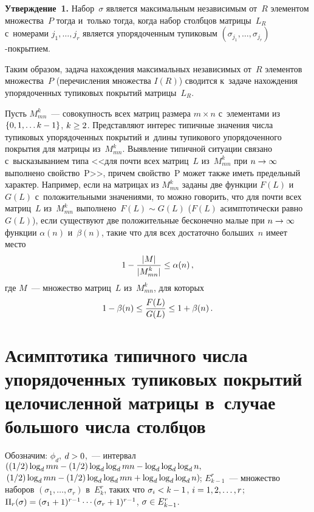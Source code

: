 \begin{multicols}{2}
    \noindent
    \textbf{Утверждение~1.} Набор~$\sigma$ является максимальным 
независимым от~$R$ элементом множества~$P$ тогда и~только тогда, когда 
набор столбцов матрицы~$L_R$ с~номерами $j_1,\ldots, j_r$ является 
упорядоченным тупиковым $(\sigma_{j_1}, \ldots , \sigma_{j_r})$-по\-кры\-тием.
    
    Таким образом, задача нахождения максимальных независимых от~$R$ 
элементов множества~$P$ (перечисления множества $I(R)$) сводится к~задаче 
нахождения упорядоченных тупиковых покрытий матрицы~$L_R$. 
    
    Пусть $M^k_{mn}$~--- совокупность всех матриц размера $m\times n$ 
    с~элементами из $\{0,1,\ldots k\hm-1\}$, $k\hm\geq 2$.  Представляют интерес 
типичные значения числа тупиковых упорядоченных покрытий и~длины 
тупикового упорядоченного покрытия для матрицы из~$M^k_{mn}$. 
Выявление типичной ситуации  связано с~высказыванием типа <<для почти 
всех матриц~$L$ из~$M_{mn}^k$ при $n\hm\to \infty$ выполнено 
свойство~P>>, причем свойство~P  может также иметь предельный характер. 
Например, если на матрицах из $M_{mn}^k$ заданы две функции $F(L)$ 
и~$G(L)$ с~положительными зна\-че\-ни\-ями, 
то  мож\-но говорить, что для почти всех мат\-риц~$L$ из~$M^k_{mn}$ 
выполнено~$F(L) \sim G(L)$ ($F(L)$ асимптотически равно $G(L)$), если 
существуют две положительные бесконечно малые при $n\hm\to\infty$ функции 
$\alpha(n)$ и~$\beta(n)$, такие что для всех достаточно больших~$n$ имеет 
место
    $$
    1-\displaystyle\frac{\displaystyle \vert M\vert\mathstrut}{\displaystyle \vert M_{mn}^k\vert\mathstrut} \leq \alpha(n)\,,
    $$
    где $M$~--- множество матриц~$L$ из~$M_{mn}^k$, для которых 
    $$
    1-\beta(n)\leq \displaystyle\frac{\displaystyle F(L)\mathstrut}{\displaystyle G(L)\mathstrut}\leq 1+\beta(n)\,.
    $$

\section{Асимптотика типичного числа упорядоченных тупиковых 
покрытий целочисленной матрицы в~случае большого числа 
столбцов}

    Обозначим: $\phi_d$, $d\hm>0$,~--- интервал 
    $\left( (1/2)\log_d mn\hm-
(1/2)\log_d \log_d mn-\log_d\log_d\log_d n,\right.\hspace*{-3.73233pt}$\linebreak
$\left.(1/2)\log_d mn - (1/2)\log_d 
\log_d mn\hm+ \log_d \log_d \log_d n\right)\hspace*{-1.3679pt}$;
    $E^r_{k-1}$~--- множество наборов $(\sigma_1,\ldots, \sigma_r)$ в~$E_k^r$, 
таких что $\sigma_i\hm< k\hm-1$, $i\hm=1,2,\ldots, r$; $\Pi_r(\sigma)\hm= 
(\sigma_1\hm+1)^{r-1} \cdots  (\sigma_r\hm+1)^{r-1}$, $\sigma\hm\in 
E^r_{k-1}$.
    

\end{multicols}
